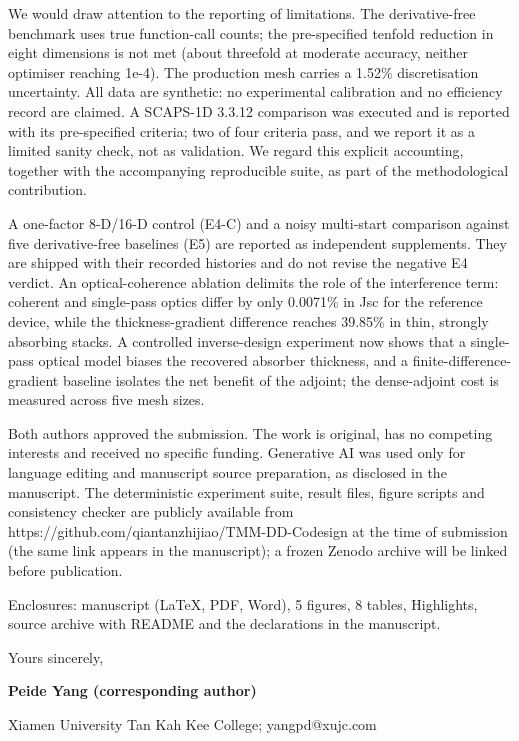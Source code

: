\documentclass[10pt]{article}
\begin{document}
We would draw attention to the reporting of limitations. The derivative-free benchmark uses true function-call counts; the pre-specified tenfold reduction in eight dimensions is not met (about threefold at moderate accuracy, neither optimiser reaching 1e-4). The production mesh carries a 1.52\% discretisation uncertainty. All data are synthetic: no experimental calibration and no efficiency record are claimed. A SCAPS-1D 3.3.12 comparison was executed and is reported with its pre-specified criteria; two of four criteria pass, and we report it as a limited sanity check, not as validation. We regard this explicit accounting, together with the accompanying reproducible suite, as part of the methodological contribution.\par
\vspace{2pt}
A one-factor 8-D/16-D control (E4-C) and a noisy multi-start comparison against five derivative-free baselines (E5) are reported as independent supplements. They are shipped with their recorded histories and do not revise the negative E4 verdict. An optical-coherence ablation delimits the role of the interference term: coherent and single-pass optics differ by only 0.0071\% in Jsc for the reference device, while the thickness-gradient difference reaches 39.85\% in thin, strongly absorbing stacks. A controlled inverse-design experiment now shows that a single-pass optical model biases the recovered absorber thickness, and a finite-difference-gradient baseline isolates the net benefit of the adjoint; the dense-adjoint cost is measured across five mesh sizes.\par
\vspace{2pt}
Both authors approved the submission. The work is original, has no competing interests and received no specific funding. Generative AI was used only for language editing and manuscript source preparation, as disclosed in the manuscript. The deterministic experiment suite, result files, figure scripts and consistency checker are publicly available from https://github.com/qiantanzhijiao/TMM-DD-Codesign at the time of submission (the same link appears in the manuscript); a frozen Zenodo archive will be linked before publication.\par
\vspace{2pt}
Enclosures: manuscript (LaTeX, PDF, Word), 5 figures, 8 tables, Highlights, source archive with README and the declarations in the manuscript.\par
\vspace{2pt}
Yours sincerely,\par
\vspace{2pt}
\textbf{Peide Yang (corresponding author)}\par
Xiamen University Tan Kah Kee College; yangpd@xujc.com\par
\end{document}
